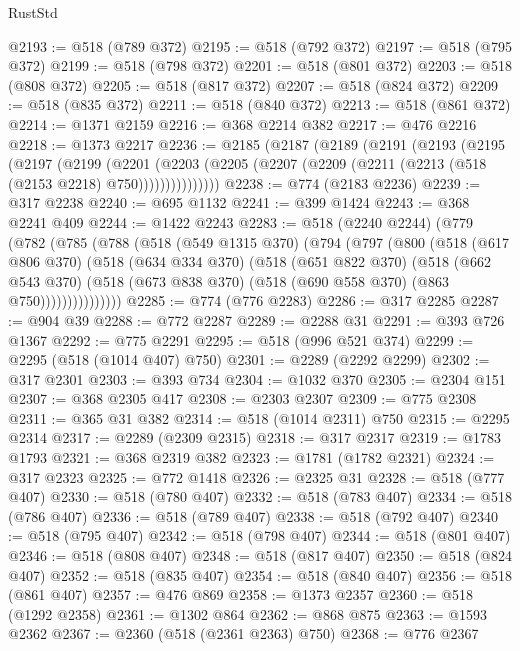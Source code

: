\begin{lexlean}{RustStd}
\begin{coremodule}
@2193 := @518 (@789 @372)
@2195 := @518 (@792 @372)
@2197 := @518 (@795 @372)
@2199 := @518 (@798 @372)
@2201 := @518 (@801 @372)
@2203 := @518 (@808 @372)
@2205 := @518 (@817 @372)
@2207 := @518 (@824 @372)
@2209 := @518 (@835 @372)
@2211 := @518 (@840 @372)
@2213 := @518 (@861 @372)
@2214 := @1371 @2159
@2216 := @368 @2214 @382
@2217 := @476 @2216
@2218 := @1373 @2217
@2236 := @2185
    (@2187
      (@2189
        (@2191
          (@2193
            (@2195
              (@2197
                (@2199
                  (@2201
                    (@2203
                      (@2205 (@2207 (@2209 (@2211 (@2213 (@518 (@2153 @2218) @750)))))))))))))))
@2238 := @774 (@2183 @2236)
@2239 := @317 @2238
@2240 := @695 @1132
@2241 := @399 @1424
@2243 := @368 @2241 @409
@2244 := @1422 @2243
@2283 := @518
    (@2240 @2244)
    (@779
      (@782
        (@785
          (@788
            (@518
              (@549 @1315 @370)
              (@794
                (@797
                  (@800
                    (@518
                      (@617 @806 @370)
                      (@518
                        (@634 @334 @370)
                        (@518
                          (@651 @822 @370)
                          (@518
                            (@662 @543 @370)
                            (@518 (@673 @838 @370) (@518 (@690 @558 @370) (@863 @750)))))))))))))))
@2285 := @774 (@776 @2283)
@2286 := @317 @2285
@2287 := @904 @39
@2288 := @772 @2287
@2289 := @2288 @31
@2291 := @393 @726 @1367
@2292 := @775 @2291
@2295 := @518 (@996 @521 @374)
@2299 := @2295 (@518 (@1014 @407) @750)
@2301 := @2289 (@2292 @2299)
@2302 := @317 @2301
@2303 := @393 @734
@2304 := @1032 @370
@2305 := @2304 @151
@2307 := @368 @2305 @417
@2308 := @2303 @2307
@2309 := @775 @2308
@2311 := @365 @31 @382
@2314 := @518 (@1014 @2311) @750
@2315 := @2295 @2314
@2317 := @2289 (@2309 @2315)
@2318 := @317 @2317
@2319 := @1783 @1793
@2321 := @368 @2319 @382
@2323 := @1781 (@1782 @2321)
@2324 := @317 @2323
@2325 := @772 @1418
@2326 := @2325 @31
@2328 := @518 (@777 @407)
@2330 := @518 (@780 @407)
@2332 := @518 (@783 @407)
@2334 := @518 (@786 @407)
@2336 := @518 (@789 @407)
@2338 := @518 (@792 @407)
@2340 := @518 (@795 @407)
@2342 := @518 (@798 @407)
@2344 := @518 (@801 @407)
@2346 := @518 (@808 @407)
@2348 := @518 (@817 @407)
@2350 := @518 (@824 @407)
@2352 := @518 (@835 @407)
@2354 := @518 (@840 @407)
@2356 := @518 (@861 @407)
@2357 := @476 @869
@2358 := @1373 @2357
@2360 := @518 (@1292 @2358)
@2361 := @1302 @864
@2362 := @868 @875
@2363 := @1593 @2362
@2367 := @2360 (@518 (@2361 @2363) @750)
@2368 := @776 @2367

\end{coremodule}
\end{lexlean}
